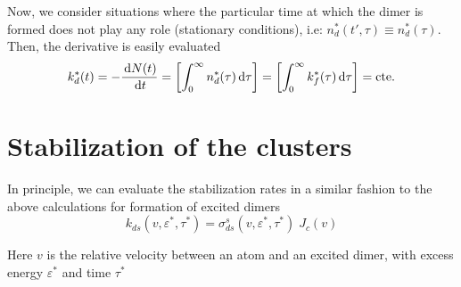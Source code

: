 Now, we consider situations where the particular time at which the dimer is formed does not play any role (stationary conditions), i.e: $n_{d}^{*}(t',\tau) \equiv n_{d}^{*}(\tau)$. Then, the derivative is easily evaluated
\begin{equation}
  \label{Q:rates-number-excit-dimers-simpler}
  k_{d}^{*}(t)= -\frac{\,\mathrm{d} N(t)}{\,\mathrm{d} t} =  \left[\int_{0}^{\infty} n_{d}^{*}(\tau) \,\mathrm{d} \tau \right] =  \left[\int_{0}^{\infty} k_{f}^{*}(\tau) \,\mathrm{d} \tau \right] = \text{cte.}
\end{equation}


\section{Stabilization of the clusters}
\label{S:stabil-cluster}

In principle, we can evaluate the stabilization rates in a similar fashion to the above calculations for formation of excited dimers
\begin{equation}
  \label{Q:rates-def-stabil-rate}
    k_{ds}(v , \varepsilon^{*}, \tau^{*}) = \sigma_{ds}^{s}(v, \varepsilon^{*}, \tau^{*}) \; J_{c}(v)
\end{equation}

Here $v$ is the relative velocity between an atom and an excited dimer, with excess energy $\varepsilon^{*}$ and time $\tau^{*}$


